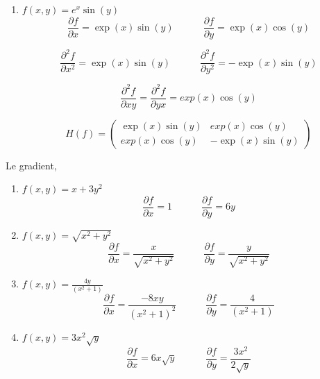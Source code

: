 \begin{solution}
\begin{enumerate}
        \item $f(x,y) =e^x\sin(y)$
        \[
        \frac{\partial f}{\partial x} = \exp(x) \sin(y) \quad \quad \quad
        \frac{\partial f}{\partial y} = \exp(x) \cos(y)
        \]
        
        \[\frac{\partial^2 f}{\partial x^2} = \exp(x) \sin(y) \quad \quad \quad
        \frac{\partial^2 f}{\partial y^2} = - \exp(x) \sin(y)
        \]
        
        \[
        \frac{\partial^2 f}{\partial xy} = \frac{\partial^2 f}{\partial yx} = exp(x) \cos(y)
        \]

        \[ H(f) = \begin{pmatrix}
        \exp(x) \sin(y) & exp(x) \cos(y)\\
        exp(x) \cos(y) & -\exp(x) \sin(y)
        \end{pmatrix}
        \]
        
    \end{enumerate}
\end{solution}

\begin{solution}
    Le gradient,
    \begin{enumerate}
        \item $f(x,y) = x + 3y^2$
        \[
        \frac{\partial f}{\partial x} = 1 \quad \quad \quad
        \frac{\partial f}{\partial y} = 6y
        \]

        \item $f(x,y) = \sqrt{x^2 + y^2}$
        \[
        \frac{\partial f}{\partial x} = \frac{x}{\sqrt{x^2 + y^2}} \quad \quad \quad
        \frac{\partial f}{\partial y} = \frac{y}{\sqrt{x^2 + y^2}}
        \]

        \item $f(x,y) = \frac{4y}{(x^2 + 1)}$
        \[
        \frac{\partial f}{\partial x} = \frac{-8xy}{(x^2 + 1)^2} \quad \quad \quad
        \frac{\partial f}{\partial y} = \frac{4}{(x^2 + 1)}
        \]

        \item $f(x,y) = 3x^2 \sqrt{y}$
         \[
        \frac{\partial f}{\partial x} = 6x \sqrt{y} \quad \quad \quad
        \frac{\partial f}{\partial y} = \frac{3x^2}{2 \sqrt{y}}
        \]
        
    \end{enumerate}
\end{solution}

